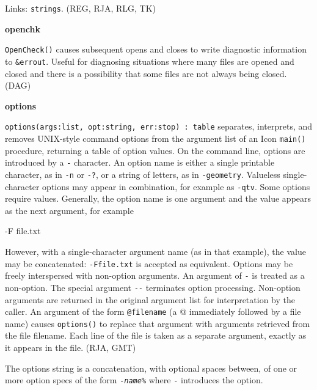 Links: \texttt{strings}. (REG, RJA, RLG, TK)

{\sffamily\bfseries
openchk}

\texttt{OpenCheck()} causes subsequent opens and closes to write
diagnostic information to \texttt{\&errout}. Useful for diagnosing
situations where many files are opened and closed and there is a
possibility that some files are not always being closed. (DAG)

{\sffamily\bfseries
options}

\texttt{options(args:list, opt:string, err:stop) : table} separates,
interprets, and removes UNIX-style command
options from the argument list of an Icon \texttt{main()} procedure,
returning a table of option values. On the command line, options are
introduced by a \texttt{{\textquotedbl}-{\textquotedbl}} character. An
option name is either a single printable character, as in
\texttt{{\textquotedbl}-n{\textquotedbl}} or
\texttt{{\textquotedbl}-?{\textquotedbl}}, or a string of letters, as
in \texttt{{\textquotedbl}-geometry{\textquotedbl}}. Valueless
single-character options may appear in combination, for example as
\texttt{{\textquotedbl}-qtv{\textquotedbl}}. Some options require
values. Generally, the option name is one argument and the value
appears as the next argument, for example

{\ttfamily
{\textquotedbl}-F file.txt{\textquotedbl}}

However, with a single-character argument name (as in that example), the
value may be concatenated:
\texttt{{\textquotedbl}-Ffile.txt{\textquotedbl}} is accepted as
equivalent. Options may be freely interspersed with non-option
arguments. An argument of \texttt{{\textquotedbl}-{\textquotedbl}} is
treated as a non-option. The special argument
\texttt{{\textquotedbl}-{}-{\textquotedbl}} terminates option
processing. Non-option arguments are returned in the original argument
list for interpretation by the caller. An argument of the form
\texttt{@filename} (a {\textquotedbl}@{\textquotedbl} immediately
followed by a file name) causes \texttt{options()} to replace that
argument with arguments retrieved from the file
{\textquotedbl}filename{\textquotedbl}. Each line of the file is taken
as a separate argument, exactly as it appears in the file. (RJA, GMT)

The options string is a concatenation, with optional spaces between, of
one or more option specs of the form
\texttt{{}-}\texttt{\textit{name}}\texttt{\%} where \texttt{{}-}
introduces the option.

